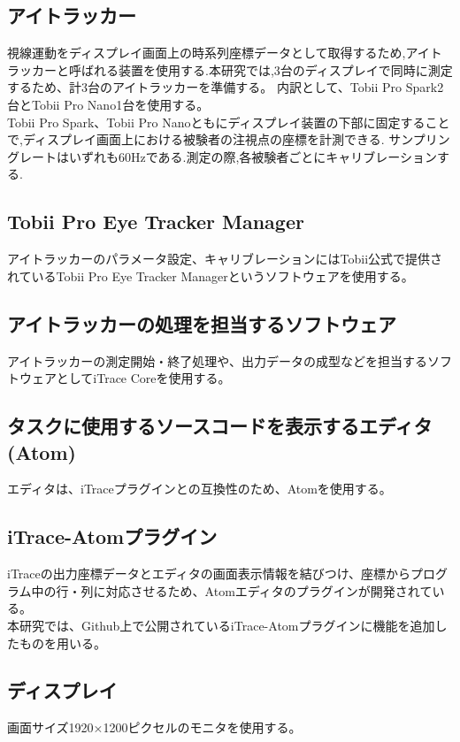 \documentclass[paper=a4paper,fontsize=11pt]{jlreq}
\begin{document}
    \subsection{アイトラッカー}
      視線運動をディスプレイ画面上の時系列座標データとして取得するため,アイトラッカーと呼ばれる装置を使用する.本研究では,3台のディスプレイで同時に測定するため、計3台のアイトラッカーを準備する。
      内訳として、Tobii Pro Spark\cite{spark}2台とTobii Pro Nano\cite{nano}1台を使用する。
      \\
      Tobii Pro Spark、Tobii Pro Nanoともにディスプレイ装置の下部に固定することで,ディスプレイ画面上における被験者の注視点の座標を計測できる.
      サンプリングレートはいずれも60Hzである.測定の際,各被験者ごとにキャリブレーションする.

    \subsection{Tobii Pro Eye Tracker Manager}
      アイトラッカーのパラメータ設定、キャリブレーションにはTobii公式で提供されているTobii Pro Eye Tracker Managerというソフトウェアを使用する。
    
    \subsection{アイトラッカーの処理を担当するソフトウェア}
      アイトラッカーの測定開始・終了処理や、出力データの成型などを担当するソフトウェアとしてiTrace Core\cite{itrace}を使用する。

    \subsection{タスクに使用するソースコードを表示するエディタ(Atom)}
      エディタは、iTraceプラグインとの互換性のため、Atom\cite{atom}を使用する。

    \subsection{iTrace-Atomプラグイン}
      iTraceの出力座標データとエディタの画面表示情報を結びつけ、座標からプログラム中の行・列に対応させるため、Atomエディタのプラグインが開発されている。\\
      本研究では、Github上で公開されているiTrace-Atomプラグインに機能を追加したものを用いる。
    
      
    \subsection{ディスプレイ}
      画面サイズ1920×1200ピクセルのモニタを使用する。
\end{document}
